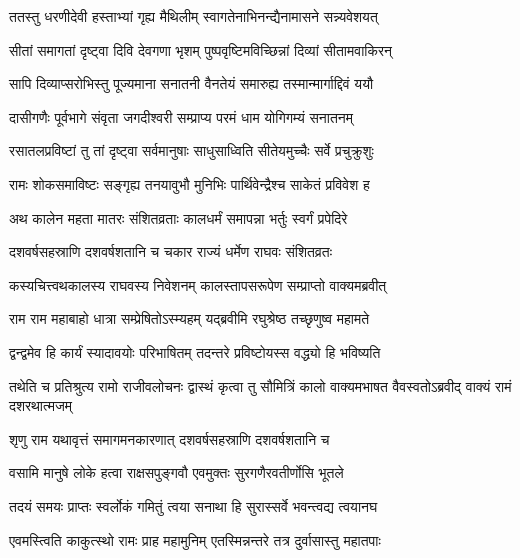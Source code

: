 \twolineshloka
{ततस्तु धरणीदेवी हस्ताभ्यां गृह्य मैथिलीम्}
{स्वागतेनाभिनन्द्यैनामासने सन्न्यवेशयत्}%

\twolineshloka
{सीतां समागतां दृष्ट्वा दिवि देवगणा भृशम्}
{पुष्पवृष्टिमविच्छिन्नां दिव्यां सीतामवाकिरन्}%

\twolineshloka
{सापि दिव्याप्सरोभिस्तु पूज्यमाना सनातनी}
{वैनतेयं समारुह्य तस्मान्मार्गाद्दिवं ययौ}%

\twolineshloka
{दासीगणैः पूर्वभागे संवृता जगदीश्वरी}
{सम्प्राप्य परमं धाम योगिगम्यं सनातनम्}%

\twolineshloka
{रसातलप्रविष्टां तु तां दृष्ट्वा सर्वमानुषाः}
{साधुसाध्विति सीतेयमुच्चैः सर्वे प्रचुक्रुशुः}%

\twolineshloka
{रामः शोकसमाविष्टः सङ्गृह्य तनयावुभौ}
{मुनिभिः पार्थिवेन्द्रैश्च साकेतं प्रविवेश ह}%

\twolineshloka
{अथ कालेन महता मातरः संशितव्रताः}
{कालधर्मं समापन्ना भर्तुः स्वर्गं प्रपेदिरे}%

\twolineshloka
{दशवर्षसहस्राणि दशवर्षशतानि च}
{चकार राज्यं धर्मेण राघवः संशितव्रतः}%

\twolineshloka
{कस्यचित्त्वथकालस्य राघवस्य निवेशनम्}
{कालस्तापसरूपेण सम्प्राप्तो वाक्यमब्रवीत्}%


\twolineshloka
{राम राम महाबाहो धात्रा सम्प्रेषितोऽस्म्यहम्}
{यद्ब्रवीमि रघुश्रेष्ठ तच्छृणुष्व महामते}%

\twolineshloka
{द्वन्द्वमेव हि कार्यं स्यादावयोः परिभाषितम्}
{तदन्तरे प्रविष्टोयस्स वद्ध्यो हि भविष्यति}%



\threelineshloka
{तथेति च प्रतिश्रुत्य रामो राजीवलोचनः}
{द्वास्थं कृत्वा तु सौमित्रिं कालो वाक्यमभाषत}
{वैवस्वतोऽब्रवीद् वाक्यं रामं दशरथात्मजम्}%


\twolineshloka
{शृणु राम यथावृत्तं समागमनकारणात्}
{दशवर्षसहस्राणि दशवर्षशतानि च}%

\twolineshloka
{वसामि मानुषे लोके हत्वा राक्षसपुङ्गवौ}
{एवमुक्तः सुरगणैरवतीर्णोसि भूतले}%

\twolineshloka
{तदयं समयः प्राप्तः स्वर्लोकं गमितुं त्वया}
{सनाथा हि सुरास्सर्वे भवन्त्वद्य त्वयानघ}%


\twolineshloka
{एवमस्त्विति काकुत्स्थो रामः प्राह महामुनिम्}
{एतस्मिन्नन्तरे तत्र दुर्वासास्तु महातपाः}%


